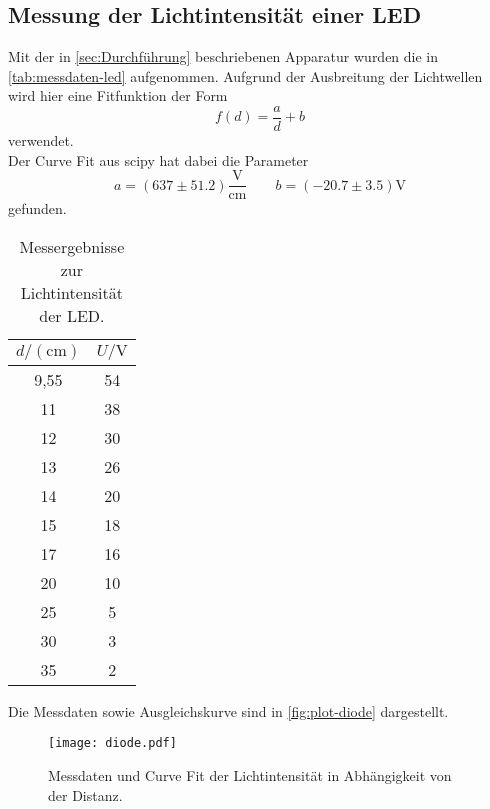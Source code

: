 \subsection{Messung der Lichtintensität einer LED}
\label{sec:Messung der Lichtintensität einer LED}
Mit der in \autoref{sec:Durchführung} beschriebenen Apparatur wurden die in 
\autoref{tab:messdaten-led} aufgenommen. Aufgrund der Ausbreitung der Lichtwellen wird
hier eine Fitfunktion der Form
\begin{equation}
	f(d) = \frac{a}{d} + b
\end{equation}
verwendet.\\
Der Curve Fit aus scipy hat dabei die Parameter
\begin{equation}
	a = (637 \pm 51.2) \frac{\si{\volt}}{\si{\centi\meter}}
	\qquad
	b = (-20.7 \pm 3.5) \si{\volt}
\end{equation}
gefunden.
\begin{table}
	\centering
	\caption{Messergebnisse zur Lichtintensität der LED.}
	\label{tab:messdaten-led}
	\begin{tabular}{c c}
		\toprule
		$d / (\si{\centi\meter})$ & $U / \si{\volt}$ \\
		\midrule
		9,55         &           54 \\
		11           &           38 \\
		12           &           30 \\
		13           &           26 \\
		14           &           20 \\
		15           &           18 \\
		17           &           16 \\
		20           &           10 \\
		25           &           5  \\
		30           &           3  \\
		35           &           2  \\
		\bottomrule
	\end{tabular}
\end{table}
Die Messdaten sowie Ausgleichskurve sind in \autoref{fig:plot-diode} dargestellt.
\begin{figure}
	\centering
	\texttt{[image: diode.pdf]}
	\caption{Messdaten und Curve Fit der Lichtintensität in Abhängigkeit von der
	Distanz.}
	\label{fig:plot-diode}
\end{figure}
